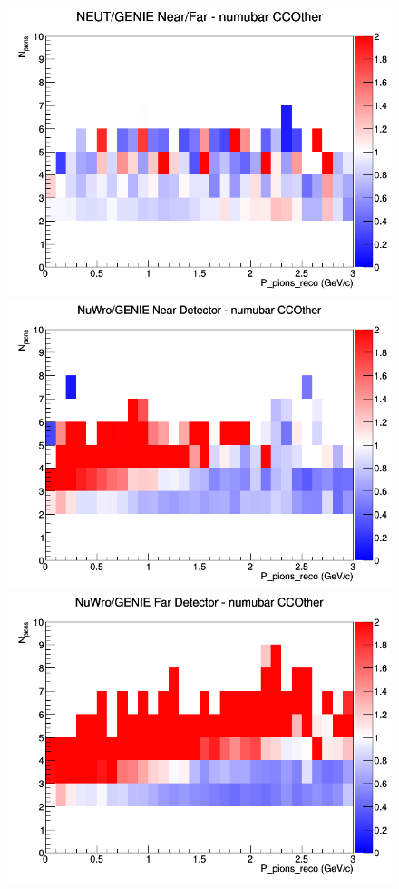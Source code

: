 \documentclass[12pt]{article}
\begin{document}
\begin{figure}[h]
\endminipage
{}
\includegraphics[width=\linewidth]{eff_N_P/GAr/pions/ratios/CCOther_NEUT_GENIE_numubar_NF_N_P.png}
\endminipage
\newline
{}
\includegraphics[width=\linewidth]{eff_N_P/GAr/pions/ratios/CCOther_NuWro_GENIE_numubar_near_N_P.png}
\endminipage
{}
\includegraphics[width=\linewidth]{eff_N_P/GAr/pions/ratios/CCOther_NuWro_GENIE_numubar_far_N_P.png}

\end{figure}
\end{document}
